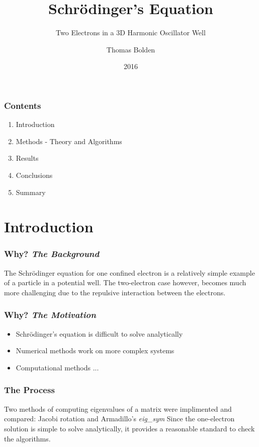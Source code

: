 \documentclass[10pt,xcolor={x11names}]{beamer}
\title{Schr\"{o}dinger's Equation}
\subtitle{Two Electrons in a 3D Harmonic Oscillator Well}
\author{Thomas Bolden}
\date{2016}
\begin{document}
	\setcounter{showProgressBar}{0}
	\setcounter{showSlideNumbers}{0}

	\frame{\titlepage}

	\begin{frame}
		\frametitle{Contents}
		\begin{enumerate}
			\item Introduction
			\item Methods - Theory and Algorithms
			\item Results
			\item Conclusions
			\item Summary
		\end{enumerate}
	\end{frame}

	\setcounter{framenumber}{0}
	\setcounter{showProgressBar}{1}
	\setcounter{showSlideNumbers}{1}

	\section{Introduction}

		\begin{frame} \frametitle{Why? {\em The Background}}
			The Schr\"{o}dinger equation for one confined electron is a relatively simple example of a particle in a potential well. The two-electron case however, becomes much more challenging due to the repulsive interaction between the electrons.
		\end{frame}

		\begin{frame}
			\frametitle{Why? {\em The Motivation}}
			\begin{itemize}
				\item<1-> Schr\"{o}dinger's equation is difficult to solve analytically
				\item<2-> Numerical methods work on more complex systems
				\item<3-> Computational methods ...
			\end{itemize}
		\end{frame}

		\begin{frame} \frametitle{The Process}
			Two methods of computing eigenvalues of a matrix were implimented and compared: 
			Jacobi rotation and Armadillo's {\em eig\_sym}
			Since the one-electron solution is simple to solve analytically, it provides a reasonable standard to check the algorithms. 
		\end{frame}
\end{document}
